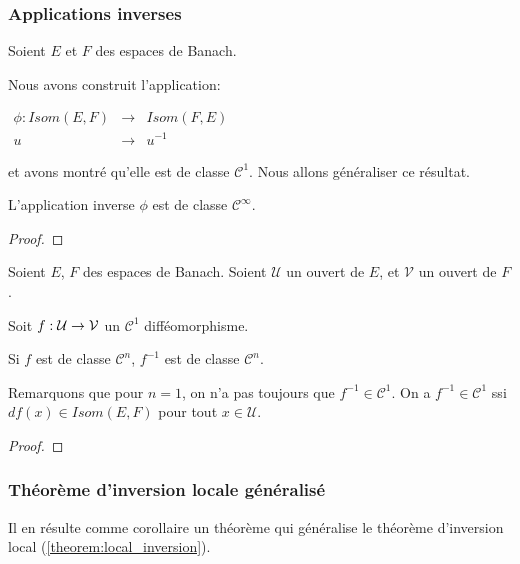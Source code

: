\subsubsection{Applications inverses}

Soient $E$ et $F$ des espaces de Banach.

Nous avons construit l'application:

\begin{center}
$
\begin{aligned}
	\phi : 	Isom(E, F) &\rightarrow& Isom(F, E) \\
			u &\rightarrow& u^{-1}
\end{aligned}
$
\end{center}
et avons montré qu'elle est de classe $\mathcal{C}^{1}$. Nous allons généraliser
ce résultat.

\begin{proposition}
	L'application inverse $\phi$ est de classe $\mathcal{C}^{\infty}$.
\end{proposition}

\ifdefined\outputproof
\begin{proof}

\end{proof}
\fi

\begin{proposition}
	Soient $E$, $F$ des espaces de Banach.
	Soient $\mathcal{U}$ un ouvert de $E$, et $\mathcal{V}$ un ouvert de $F$.

	Soit $f : \mathcal{U} \rightarrow \mathcal{V}$ un $\mathcal{C}^{1}$
	difféomorphisme.

	Si $f$ est de classe $\mathcal{C}^{n}$, $f^{-1}$ est de classe
	$\mathcal{C}^{n}$.
\end{proposition}

Remarquons que pour $n = 1$, on n'a pas toujours que $f^{-1} \in
\mathcal{C}^{1}$. On a $f^{-1} \in \mathcal{C}^{1}$ ssi $df(x) \in Isom(E, F)$
pour tout $x \in \mathcal{U}$.

\ifdefined\outputproof
\begin{proof}

\end{proof}
\fi

\subsubsection{Théorème d'inversion locale généralisé}

Il en résulte comme corollaire un théorème qui généralise le théorème
d'inversion local (\ref{theorem:local_inversion}).

